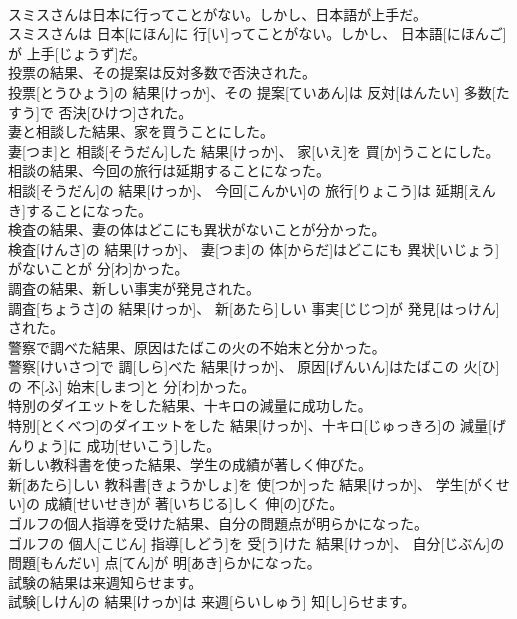 \documentclass[8pt]{extreport}
\begin{document}
\begin{CJK}{UTF8}{min}
\\	スミスさんは日本に行ってことがない。しかし、日本語が上手だ。	
\\	スミスさんは 日本[にほん]に 行[い]ってことがない。しかし、 日本語[にほんご]が 上手[じょうず]だ。
\\	投票の結果、その提案は反対多数で否決された。	
\\	投票[とうひょう]の 結果[けっか]、その 提案[ていあん]は 反対[はんたい] 多数[たすう]で 否決[ひけつ]された。
\\	妻と相談した結果、家を買うことにした。	
\\	妻[つま]と 相談[そうだん]した 結果[けっか]、 家[いえ]を 買[か]うことにした。
\\	相談の結果、今回の旅行は延期することになった。	
\\	相談[そうだん]の 結果[けっか]、 今回[こんかい]の 旅行[りょこう]は 延期[えんき]することになった。
\\	検査の結果、妻の体はどこにも異状がないことが分かった。	
\\	検査[けんさ]の 結果[けっか]、 妻[つま]の 体[からだ]はどこにも 異状[いじょう]がないことが 分[わ]かった。
\\	調査の結果、新しい事実が発見された。	
\\	調査[ちょうさ]の 結果[けっか]、 新[あたら]しい 事実[じじつ]が 発見[はっけん]された。
\\	警察で調べた結果、原因はたばこの火の不始末と分かった。	
\\	警察[けいさつ]で 調[しら]べた 結果[けっか]、 原因[げんいん]はたばこの 火[ひ]の 不[ふ] 始末[しまつ]と 分[わ]かった。
\\	特別のダイエットをした結果、十キロの減量に成功した。	
\\	特別[とくべつ]のダイエットをした 結果[けっか]、十キロ[じゅっきろ]の 減量[げんりょう]に 成功[せいこう]した。
\\	新しい教科書を使った結果、学生の成績が著しく伸びた。	
\\	新[あたら]しい 教科書[きょうかしょ]を 使[つか]った 結果[けっか]、 学生[がくせい]の 成績[せいせき]が 著[いちじる]しく 伸[の]びた。
\\	ゴルフの個人指導を受けた結果、自分の問題点が明らかになった。	
\\	ゴルフの 個人[こじん] 指導[しどう]を 受[う]けた 結果[けっか]、 自分[じぶん]の 問題[もんだい] 点[てん]が 明[あき]らかになった。
\\	試験の結果は来週知らせます。	
\\	試験[しけん]の 結果[けっか]は 来週[らいしゅう] 知[し]らせます。

\end{CJK}
\end{document}
